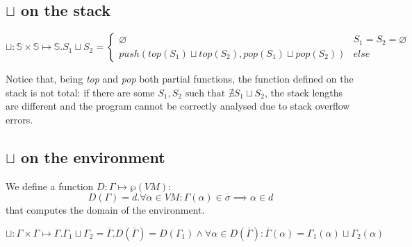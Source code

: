 \documentclass{amsart}
\newcommand{\bS}{\mathbb{S}}
\renewcommand{\emptyset}{\varnothing}
\numberwithin{equation}{section}
\theoremstyle{plain} %
\theoremstyle{definition}
\theoremstyle{remark}
\begin{document}
\subsection{$\sqcup$ on the stack}
\[
\sqcup: \bS{} \times \bS{} \mapsto \bS{}. S_1 \sqcup S_2 =
\begin{cases}
\emptyset & S_1 = S_2 = \emptyset\\
push(top(S_1) \sqcup top(S_2), pop(S_1) \sqcup pop(S_2)) & else
\end{cases}
\]

Notice that, being \emph{top} and \emph{pop} both partial functions, the function defined on the stack is not total: if there are some $S_1, S_2 \text{ such that } \nexists S_1 \sqcup S_2$, the stack lengths are different and the program cannot be correctly analysed due to stack overflow errors.

\subsection{$\sqcup$ on the environment}
We define a function $D: \Gamma \mapsto \wp(VM)$:\\
\[D(\Gamma) = d.\forall \alpha \in VM: \Gamma(\alpha) \in \sigma \implies \alpha \in d\]
that computes the domain of the environment.

\[
\sqcup: \Gamma \times \Gamma \mapsto \Gamma. \Gamma_1 \sqcup \Gamma_2 = \overline{\Gamma}. D(\overline{\Gamma}) = D(\Gamma_1) \wedge \forall \alpha \in D(\overline{\Gamma}): \overline{\Gamma}(\alpha) = \Gamma_1(\alpha) \sqcup \Gamma_2(\alpha)
\]


\newpage
\end{document}
